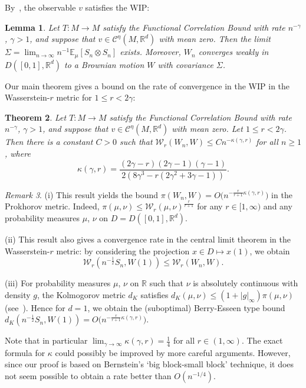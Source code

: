 \documentclass[11pt,a4paper,reqno,oneside]{amsart}
\newcommand{\R}{\ensuremath{\mathbb{R}}}%
\newcommand{\norminf}[1]{\left|#1\right|_\infty}
\newcommand{\holsp}[1][\eta]{\mathcal{C}^{#1}}
\newcommand{\Ex}[2][]{\mathbb{E}_{#1\!\!}\left[#2\right]}
\newcommand{\wass}{\mathcal{W}}
\newtheorem{theorem}{Theorem}[section]
\newtheorem{lemma}[theorem]{Lemma}
\theoremstyle{definition}
\theoremstyle{remark}
\newtheorem{remark}[theorem]{Remark}
\numberwithin{equation}{section}
\begin{document}
	
	 By~\cite[Theorem 1.2]{fleming_fcb_homogenisation}, the observable $v$ satisfies the WIP:
	\begin{lemma}
		Let $ T:M\to M $ satisfy the Functional Correlation Bound with rate $ n^{-\gamma} $, $ \gamma>1 $, and suppose that $ v\in \holsp(M,\R^d)$ with mean zero. Then the limit $\Sigma = \lim_{n\to \infty}n^{-1}\Ex[\mu]{S_n \otimes S_n}$ exists. Moreover, $W_n$ converges weakly in $D([0,1],\R^d)$ to a Brownian motion $W$ with covariance $\Sigma$.
	\end{lemma}
	Our main theorem gives a bound on the rate of convergence in the WIP in the Wasserstein-$r$ metric for $1\le r<2\gamma$:
\begin{theorem}\label{thm:rates_wip_lip}
	Let $ T:M\to M $ satisfy the Functional Correlation Bound with rate $ n^{-\gamma} $, $ \gamma>1 $, and suppose that $ v\in \holsp(M,\R^d)$ with mean zero. Let $1\le r<2\gamma$. Then there is a constant $ C>0 $ such that $ \wass_r(W_n,W)\le Cn^{-\kappa(\gamma,r)} $ for all $ n\ge 1 $, where 
	\begin{equation*}
		\kappa(\gamma,r)=\frac{(2\gamma-r)(2\gamma-1)(\gamma-1)}{2(8\gamma^3 - r(2\gamma^2 + 3\gamma - 1))}.
	\end{equation*}
\end{theorem}
\begin{remark}
	(i) This result yields the bound $\pi(W_n,W)=O\big(n^{-\frac{r}{r+1}\kappa(\gamma,r)}\big)$ in the Prokhorov metric. Indeed, $\pi(\mu,\nu)\le \wass_r(\mu,\nu)^{\frac{r}{r+1}}$ for any $r\in [1,\infty)$ and any probability measures $\mu$, $\nu$ on $D=D([0,1],\R^d)$.

    (ii) This result also gives a convergence rate in the central limit theorem in the Wasserstein-$r$ metric: by considering the projection $x\in D\mapsto x(1)$, we obtain \[\wass_r(n^{-\frac12}S_n,W(1))\le \wass_r(W_n,W).\]

    (iii) For probability measures $\mu$, $\nu$ on $\R$ such that $\nu$ is absolutely continuous with density $g$, the Kolmogorov metric $d_K$ satisfies $d_K(\mu,\nu)\le (1+\norminf{g})\pi(\mu,\nu)$ (see~\cite{gibbs_su}). Hence for $d=1$, we obtain the (suboptimal) Berry-Esseen type bound $d_K(n^{-\frac12}S_n,W(1))=O\big(n^{-\frac{r}{r+1}\kappa(\gamma,r)}\big)$.
\end{remark}
Note that in particular $\lim_{\gamma\to\infty}\kappa(\gamma,r)=\frac{1}{4}$ for all $r\in (1,\infty)$. The exact formula for $ \kappa$ could possibly be improved by more careful arguments. However, since our proof is based on Bernstein's `big block-small block' technique, it does not seem possible to obtain a rate better than $ O(n^{-1/4}) $.
\end{document}
